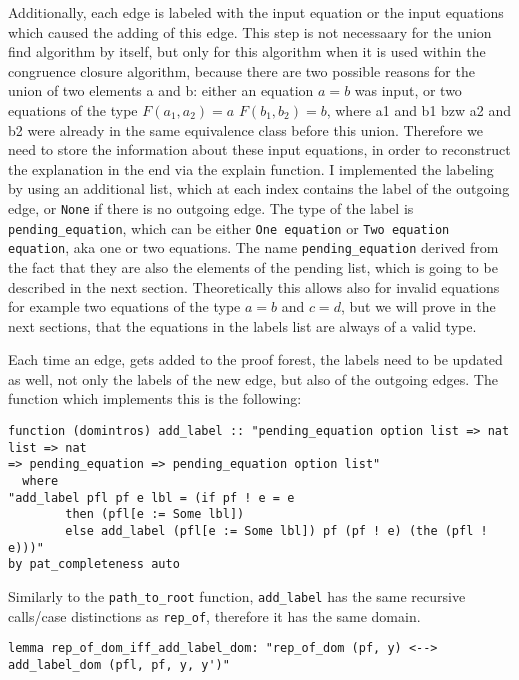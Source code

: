 Additionally, each edge is labeled with the input equation or the input equations which caused the adding of this edge. This step is not necessaary for the union find algorithm by itself, but only for this algorithm when it is used within the congruence closure algorithm, because there are two possible reasons for the union of two elements a and b: either an equation $a = b$ was input, or two equations of the type $F(a_1, a_2) = a$ $F(b_1, b_2) = b$, where a1 and b1 bzw a2 and b2 were already in the same equivalence class before this union. Therefore we need to store the information about these input equations, in order to reconstruct the explanation in the end via the explain function. I implemented the labeling by using an additional list, which at each index contains the label of the outgoing edge, or \lstinline{None} if there is no outgoing edge. The type of the label is \lstinline{pending_equation}, which can be either \lstinline{One equation} or \lstinline{Two equation equation}, aka one or two equations. The name \lstinline{pending_equation} derived from the fact that they are also the elements of the pending list, which is going to be described in the next section. Theoretically this allows also for invalid equations for example two equations of the type $a = b$ and $c = d$, but we will prove in the next sections, that the equations in the labels list are always of a valid type.

Each time an edge, gets added to the proof forest, the labels need to be updated as well, not only the labels of the new edge, but also of the outgoing edges. The function which implements this is the following:

\begin{lstlisting}
function (domintros) add_label :: "pending_equation option list => nat list => nat 
=> pending_equation => pending_equation option list"
  where
"add_label pfl pf e lbl = (if pf ! e = e 
		then (pfl[e := Some lbl]) 
		else add_label (pfl[e := Some lbl]) pf (pf ! e) (the (pfl ! e)))"
by pat_completeness auto
\end{lstlisting}

Similarly to the \lstinline{path_to_root} function, \lstinline{add_label} has the same recursive calls/case distinctions as \lstinline{rep_of}, therefore it has the same domain.

\begin{lstlisting}
lemma rep_of_dom_iff_add_label_dom: "rep_of_dom (pf, y) <--> 
add_label_dom (pfl, pf, y, y')"
\end{lstlisting}


